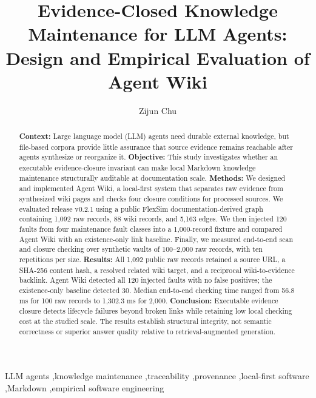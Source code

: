\documentclass[preprint,12pt,a4paper]{elsarticle}
\begin{document}
\begin{frontmatter}

\title{Evidence-Closed Knowledge Maintenance for LLM Agents: Design and Empirical Evaluation of Agent Wiki}

\author[independent]{Zijun Chu}
\address[independent]{Independent Researcher, Room 1303, No. 19, Lane 899,
Xinfeng Middle Road, Qingpu District, Shanghai, China}

\begin{abstract}
\textbf{Context:} Large language model (LLM) agents need durable external
knowledge, but file-based corpora provide little assurance that source evidence
remains reachable after agents synthesize or reorganize it.
\textbf{Objective:} This study investigates whether an executable
evidence-closure invariant can make local Markdown knowledge maintenance
structurally auditable at documentation scale.
\textbf{Methods:} We designed and implemented Agent Wiki, a local-first system
that separates raw evidence from synthesized wiki pages and checks four closure
conditions for processed sources. We evaluated release v0.2.1 using a public
FlexSim documentation-derived graph containing 1,092 raw records, 88 wiki
records, and 5,163 edges. We then injected 120 faults from four maintenance
fault classes into a 1,000-record fixture and compared Agent Wiki with an
existence-only link baseline. Finally, we measured end-to-end scan and closure
checking over synthetic vaults of 100--2,000 raw records, with ten repetitions
per size.
\textbf{Results:} All 1,092 public raw records retained a source URL, a SHA-256
content hash, a resolved related wiki target, and a reciprocal wiki-to-evidence
backlink. Agent Wiki detected all 120 injected faults with no false positives;
the existence-only baseline detected 30. Median end-to-end checking time ranged
from 56.8 ms for 100 raw records to 1,302.3 ms for 2,000.
\textbf{Conclusion:} Executable evidence closure detects lifecycle failures
beyond broken links while retaining low local checking cost at the studied
scale. The results establish structural integrity, not semantic correctness or
superior answer quality relative to retrieval-augmented generation.
\end{abstract}

\begin{keyword}
LLM agents \sep knowledge maintenance \sep traceability \sep provenance
\sep local-first software \sep Markdown \sep empirical software engineering
\end{keyword}

\end{frontmatter}
\end{document}
